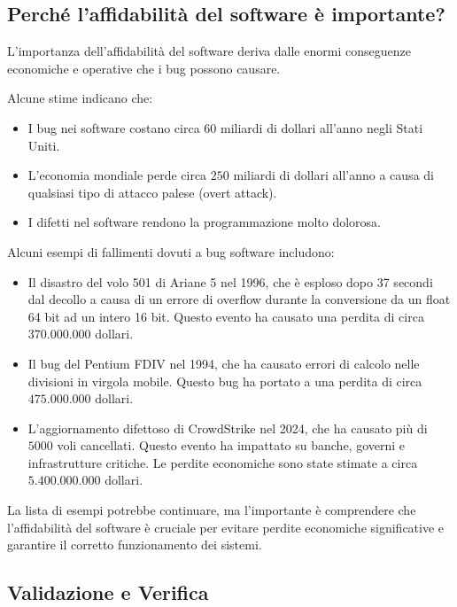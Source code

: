 \subsection{Perché l'affidabilità del software è importante?}

L'importanza dell'affidabilità del software deriva dalle enormi conseguenze
economiche e operative che i bug possono causare.

Alcune stime indicano che:
\begin{itemize}
    \item I bug nei software costano circa \(60\) miliardi di dollari all'anno
    negli Stati Uniti.
    \item L'economia mondiale perde circa \(250\) miliardi di dollari all'anno
    a causa di qualsiasi tipo di attacco palese (overt attack).
    \item I difetti nel software rendono la programmazione molto dolorosa.
\end{itemize}

Alcuni esempi di fallimenti dovuti a bug software includono:
\begin{itemize}
    \item Il disastro del volo 501 di Ariane 5 nel 1996, che è esploso dopo 37 secondi
    dal decollo a causa di un errore di overflow durante la conversione da un float 64 bit ad un intero 16 bit.
    Questo evento ha causato una perdita di circa \(370.000.000\) dollari.
    \item Il bug del Pentium FDIV nel 1994, che ha causato errori di calcolo
    nelle divisioni in virgola mobile. Questo bug ha portato a una perdita di
    circa \(475.000.000\) dollari.
    \item L'aggiornamento difettoso di CrowdStrike nel 2024, che ha causato
    più di \(5000\) voli cancellati. Questo evento ha impattato su banche,
    governi e infrastrutture critiche. Le perdite economiche sono state
    stimate a circa \(5.400.000.000\) dollari.
\end{itemize}

La lista di esempi potrebbe continuare, ma l'importante è comprendere
che l'affidabilità del software è cruciale per evitare perdite economiche
significative e garantire il corretto funzionamento dei sistemi.

\subsection{Validazione e Verifica}

